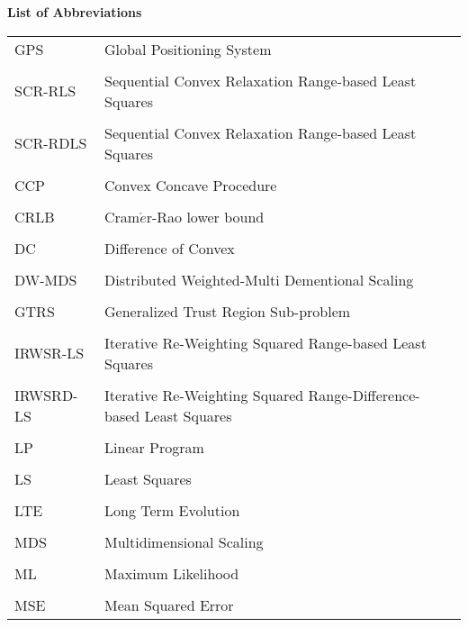 \newpage


\phantom{m}

\begin{flushleft}
\begin{Huge}
\textbf{List of Abbreviations}
\end{Huge}
\end{flushleft}

\phantom{m}

\begin{longtable}[h]{l l}
GPS & Global Positioning System \\
\\
SCR-RLS & Sequential Convex Relaxation Range-based Least Squares \\
\\
SCR-RDLS & Sequential Convex Relaxation Range-based Least Squares\\
\\
CCP & Convex Concave Procedure \\
\\
CRLB & Cram$\acute{e}$r-Rao  lower  bound \\
\\
DC & Difference of Convex \\
\\
DW-MDS & Distributed Weighted-Multi Dementional Scaling \\
\\
GTRS & Generalized Trust Region Sub-problem \\
\\
IRWSR-LS & Iterative Re-Weighting Squared Range-based Least Squares \\
\\
IRWSRD-LS & Iterative Re-Weighting Squared Range-Difference-based Least Squares\\
\\
LP & Linear Program \\
\\
LS & Least Squares \\
\\
LTE & Long Term Evolution \\
\\
MDS & Multidimensional Scaling \\ 
\\
ML & Maximum Likelihood \\
\\
MSE & Mean Squared Error\\

\end{longtable}
